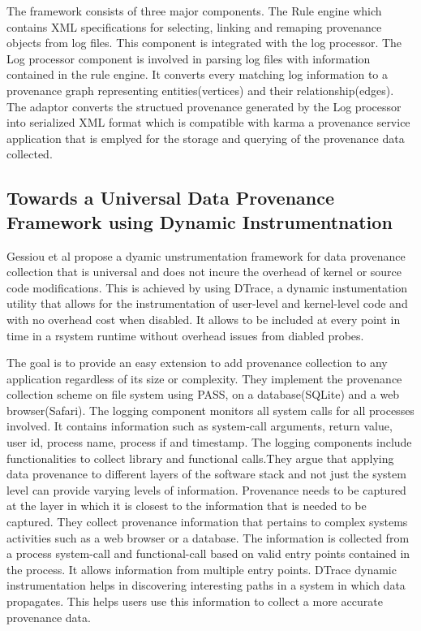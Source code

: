 The framework consists of three major components. The Rule engine which contains XML specifications for selecting, linking and remaping provenance objects from log files. This component is integrated with the log processor. The Log processor component is involved in parsing log files with information contained in the rule engine. It converts every matching log information to a provenance graph representing entities(vertices) and their relationship(edges). The adaptor converts the structued provenance generated by the Log processor into serialized XML format which is compatible with karma a provenance service application that is emplyed for the storage and querying of the provenance data collected.




\subsection{Towards a Universal Data Provenance Framework using Dynamic Instrumentnation}

Gessiou et al propose a dyamic unstrumentation framework for data provenance collection that is universal and does not incure the overhead of kernel or source code modifications. This is achieved by using DTrace, a dynamic instumentation utility that allows for the instrumentation of user-level and kernel-level code and with no overhead cost when disabled. It allows to be included at every point in time in a rsystem  runtime without overhead issues from diabled probes.

The goal is to provide an easy extension to add provenance collection to any application regardless of its size or complexity. They implement the provenance collection scheme on file system using PASS, on a database(SQLite) and a web browser(Safari). 
The logging component monitors all system calls for all processes involved. It contains information such as system-call arguments, return value, user id, process name, process if and timestamp. The logging components include functionalities to collect library and functional calls.They argue that applying data provenance to different layers of the software stack and not just the system level can provide varying levels of information.  Provenance needs to be captured at the layer in which it is closest to the information that is needed to be captured. They collect provenance information that pertains to complex systems activities such as a web browser or a database. The information is collected from a process system-call and functional-call based on valid entry points contained in the process. It allows information from multiple entry points. DTrace dynamic instrumentation helps in discovering interesting paths in a system in which data propagates. This helps users use this information to collect a more accurate provenance data.



